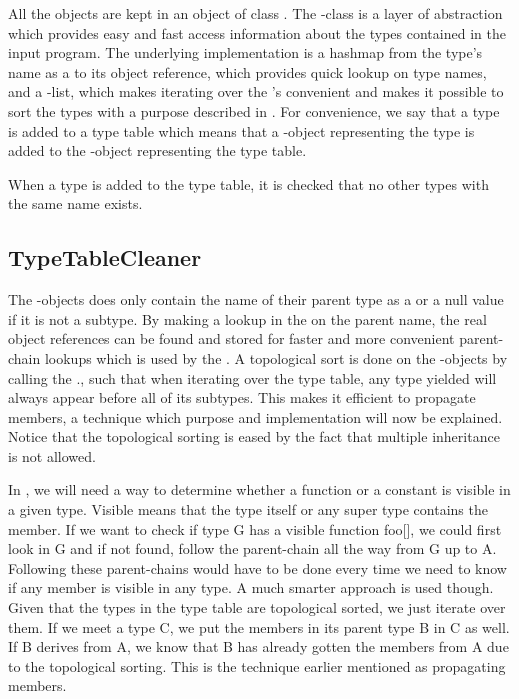 All the  objects are kept in an object of class . The -class is a layer of abstraction which provides easy and fast access information about the types contained in the input program. The underlying implementation is a hashmap from the type's name as a  to its object reference, which provides quick lookup on type names, and a -list, which makes iterating over the 's convenient and makes it possible to sort the types with a purpose described in . For convenience, we say that a type is added to a type table which means that a -object representing the type is added to the -object representing the type table.

When a type is added to the type table, it is checked that no other types with the same name exists.

\subsection{TypeTableCleaner}
\label{sec:typetablecleaner}
The -objects does only contain the name of their parent type as a  or a null value if it is not a subtype. By making a lookup in the  on the parent name, the real object references can be found and stored for faster and more convenient parent-chain lookups which is used by the .
A topological sort is done on the -objects by calling the ., such that when iterating over the type table, any type yielded will always appear before all of its subtypes. This makes it efficient to propagate members, a technique which purpose and implementation will now be explained. Notice that the topological sorting is eased by the fact that multiple inheritance is not allowed.

In , we will need a way to determine whether a function or a constant is visible in a given type. 
Visible means that the type itself or any super type contains the member. If we want to check if type G has a visible function foo[], we could first look in G and if not found, follow the parent-chain all the way from G up to A. Following these parent-chains would have to be done every time we need to know if any member is visible in any type. A much smarter approach is used though. Given that the types in the type table are topological sorted, we just iterate over them. If we meet a type C, we put the members in its parent type B in C as well. If B derives from A, we know that B has already gotten the members from A due to the topological sorting. This is the technique earlier mentioned as propagating members.

